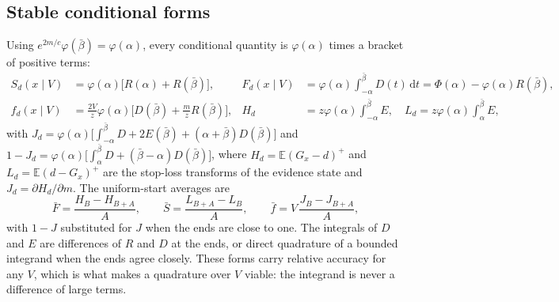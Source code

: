 \documentclass[11pt]{article}
\newcommand{\E}{\mathbb{E}}
\newcommand{\dd}{\,\mathrm{d}}
\begin{document}
\subsection{Stable conditional forms}
Using $e^{2m/c}\varphi(\bar\beta)=\varphi(\alpha)$, every conditional quantity is $\varphi(\alpha)$ times a bracket of positive terms:
\begin{align}
S_d(x\mid V)&=\varphi(\alpha)\big[R(\alpha)+R(\bar\beta)\big], &
F_d(x\mid V)&=\varphi(\alpha)\!\int_{-\alpha}^{\bar\beta}D(t)\dd t=\Phi(\alpha)-\varphi(\alpha)R(\bar\beta),
\label{eq:stabSF}\\
f_d(x\mid V)&=\frac{2V}{z}\varphi(\alpha)\Big[D(\bar\beta)+\frac{m}{z}R(\bar\beta)\Big], &
H_d&=z\varphi(\alpha)\!\int_{-\alpha}^{\bar\beta}E,\quad
L_d=z\varphi(\alpha)\!\int_{\alpha}^{\bar\beta}E,
\label{eq:stabfHL}
\end{align}
with $J_d=\varphi(\alpha)\big[\int_{-\alpha}^{\bar\beta}D+2E(\bar\beta)+(\alpha+\bar\beta)D(\bar\beta)\big]$ and $1-J_d=\varphi(\alpha)\big[\int_{\alpha}^{\bar\beta}D+(\bar\beta-\alpha)D(\bar\beta)\big]$, where $H_d=\E(G_x-d)^+$ and $L_d=\E(d-G_x)^+$ are the stop-loss transforms of the evidence state and $J_d=\partial H_d/\partial m$. The uniform-start averages are
\begin{equation}
\bar F=\frac{H_B-H_{B+A}}{A},\qquad \bar S=\frac{L_{B+A}-L_B}{A},\qquad \bar f=V\,\frac{J_B-J_{B+A}}{A},
\label{eq:startavg}
\end{equation}
with $1-J$ substituted for $J$ when the ends are close to one. The integrals of $D$ and $E$ are differences of $R$ and $D$ at the ends, or direct quadrature of a bounded integrand when the ends agree closely. These forms carry relative accuracy for any $V$, which is what makes a quadrature over $V$ viable: the integrand is never a difference of large terms.
\end{document}
